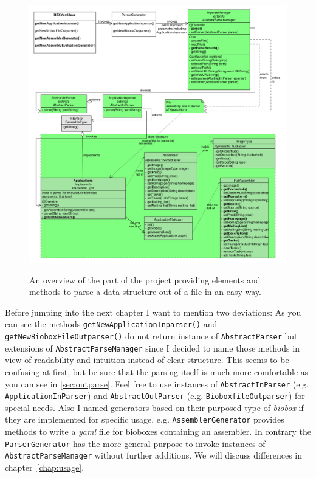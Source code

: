 \documentclass[
	twoside,
	fontsize=12pt,
	headsepline,
	cleardoublepage=empty,
	numbers=noenddot,
	bibliography=totoc,
]{scrbook}
\newcommand{\code}[1]{\texttt{#1}}
\begin{document}
\begin{figure}[h]
	\includegraphics[scale=0.33]{images/inparse.png}
	\label{fig:inparse}
	\caption{An overview of the part of the project providing elements and methods to parse a data structure out of a file in an easy way.}
\end{figure}

Before jumping into the next chapter I want to mention two deviations:
As you can see the methods \code{getNewApplicationInparser()} and \\ \code{getNewBioboxFileOutparser()} do not return instance of \code{AbstractParser} but extensions of \code{AbstractParseManager} since I decided to name those methods in view of readability and intuition instead of clear structure. This seems to be confusing at first, but be sure that the parsing itself is much more comfortable as you can see in \ref{sec:outparse}. Feel free to use instances of \code{AbstractInParser} (e.g. \code{ApplicationInParser}) and \code{AbstractOutParser} (e.g. \code{BioboxfileOutparser}) for special needs.
Also I named generators based on their purposed type of \emph{biobox} if they are implemented for specific usage, e.g. \code{AssemblerGenerator} provides methods to write a \emph{yaml} file for bioboxes containing an assembler. In contrary the \code{ParserGenerator} has the more general purpose to invoke instances of \code{AbstractParseManager} without further additions. We will discuss differences in chapter~\ref{chap:usage}. 
\end{document}
